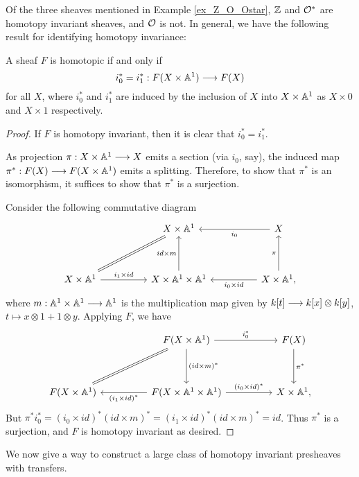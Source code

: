 Of the three sheaves mentioned in Example \ref{ex_Z_O_Ostar}, $\mathbb{Z}$
and $\mathcal{O}^*$ are homotopy invariant sheaves, and $\mathcal{O}$ is not. In 
general, we have the following result for identifying homotopy 
invariance:

\begin{lem}
A sheaf $F$ is homotopic if and only if
\[
i_0^* = i_1^* : F(X \times \mathbb{A}^1) \longrightarrow F(X)
\]
for all $X$, where $i_0^*$ and $i_1^*$ are induced by the 
inclusion of $X$ into $X \times \mathbb{A}^1$ as $X \times 0$ and $X 
\times 1$ respectively.
\end{lem}
\begin{proof}
If $F$ is homotopy invariant, then it is clear that $i_0^* = 
i_1^*$.

As projection $\pi: X \times \mathbb{A}^1 \longrightarrow X$ emits a section (via $i_0$, 
say), the induced map $\pi^*: F(X) \longrightarrow F(X \times \mathbb{A}^1)$ emits a
splitting. Therefore, to show that $\pi^*$ is an isomorphism, it
suffices to show that $\pi^*$ is a surjection.

Consider the following commutative diagram
\[
\begin{tikzcd}[row sep=huge, column sep=huge]
{}&
X \times \A^1&
X \arrow{l}{i_0}\\
X \times \A^1 \arrow[equals]{ru} \arrow{r}{i_1 \times id}&
X \times \A^1 \times \A^1 \arrow{u}{id \times m} &
X \times \A^1 \arrow{l}{i_0 \times id} \arrow{u}{\pi},
\end{tikzcd}
\]
where $m: \mathbb{A}^1 \times \mathbb{A}^1 \longrightarrow \mathbb{A}^1$ is the multiplication map
given by $k [t] \longrightarrow k [x] \otimes k 
[y]$, $t \mapsto x \otimes 1 + 1 \otimes y$. Applying $F$, we
have
\[
\begin{tikzcd}[row sep=huge, column sep=huge]
{}&
F(X \times \A^1) \arrow{r}{i_0^*}\arrow[equals]{ld}
   \arrow{d}{(id \times m)^*}&
F(X) \arrow{d}{\pi^*} \\
F(X \times \A^1)&
F(X \times \A^1 \times \A^1) \arrow{l}{(i_1 \times id)^*} 
   \arrow{r}{(i_0 \times id)^*}&
X \times \A^1,
\end{tikzcd}
\]
But $\pi^*i_0^* = (i_0 \times id)^*(id \times m)^* =
(i_1 \times id)^*(id \times m)^* = id$. Thus $\pi^*$ is a 
surjection, and $F$ is homotopy invariant as desired.
\end{proof}

We now give a way to construct a large class of homotopy invariant
presheaves with transfers.

